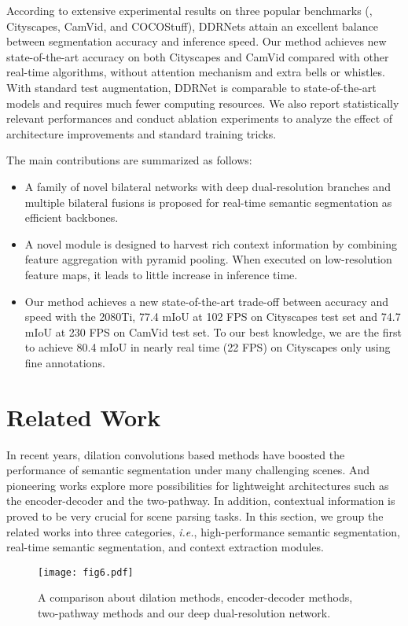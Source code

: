 \documentclass[journal]{IEEEtran}
\begin{document}
According to extensive experimental results on three popular benchmarks (, Cityscapes, CamVid, and COCOStuff), DDRNets attain an excellent balance between segmentation accuracy and inference speed. Our method achieves new state-of-the-art accuracy on both Cityscapes and CamVid compared with other real-time algorithms, without attention mechanism and extra bells or whistles. With standard test augmentation, DDRNet is comparable to state-of-the-art models and requires much fewer computing resources. We also report statistically relevant performances and conduct ablation experiments to analyze the effect of architecture improvements and standard training tricks.

The main contributions are summarized as follows:
\begin{itemize}
  \item A family of novel bilateral networks with deep dual-resolution branches and multiple bilateral fusions is proposed for real-time semantic segmentation as efficient backbones.
  \item A novel module is designed to harvest rich context information by combining feature aggregation with pyramid pooling. When executed on low-resolution feature maps, it leads to little increase in inference time.
  \item Our method achieves a new state-of-the-art trade-off between accuracy and speed with the 2080Ti, 77.4 mIoU at 102 FPS on Cityscapes test set and 74.7 mIoU at 230 FPS on CamVid test set. To our best knowledge, we are the first to achieve 80.4 mIoU in nearly real time (22 FPS) on Cityscapes only using fine annotations.

\end{itemize}
\section{Related Work}

In recent years, dilation convolutions based methods have boosted the performance of semantic segmentation under many challenging scenes. And pioneering works explore more possibilities for lightweight architectures such as the encoder-decoder and the two-pathway. In addition, contextual information is proved to be very crucial for scene parsing tasks. In this section, we group the related works into three categories, \emph{i.e.}, high-performance semantic segmentation, real-time semantic segmentation, and context extraction modules.

\begin{figure*}[!t]
\centerline{\texttt{[image: fig6.pdf]}}
\caption{A comparison about dilation methods, encoder-decoder methods, two-pathway methods and our deep dual-resolution network.}
\label{fig6}
\end{figure*}
\end{document}
